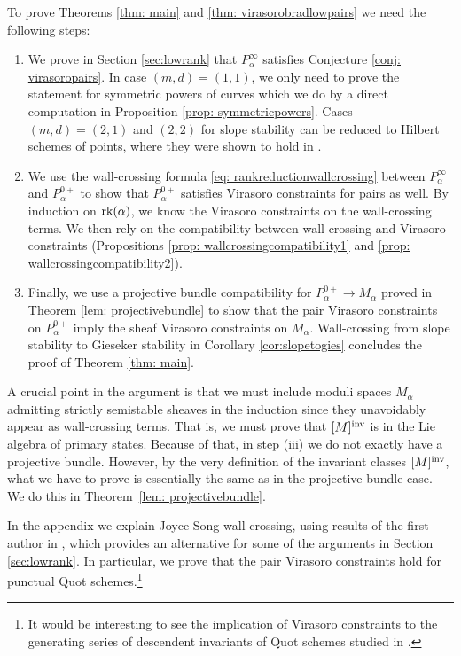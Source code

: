 \documentclass[a4paper, 12pt]{amsart}
\begin{document}
To prove Theorems \ref{thm: main} and \ref{thm: virasorobradlowpairs} we need the following steps:
\begin{enumerate}
\item[(i)] We prove in Section \ref{sec:lowrank} that $P^{\infty}_\alpha$ satisfies Conjecture \ref{conj: virasoropairs}. In case $(m,d)=(1,1)$, we only need to prove the statement for symmetric powers of curves which we do by a direct computation in Proposition \ref{prop: symmetricpowers}. Cases $(m,d)=(2,1)$ and $(2,2)$ for slope stability can be reduced to Hilbert schemes of points, where they were shown to hold in \cite{moop, moreira}.
\item[(ii)] We use the wall-crossing formula \eqref{eq: rankreductionwallcrossing} between $P^{\infty}_\alpha$ and $P^{0+}_\alpha$ to show that $P^{0+}_\alpha$ satisfies Virasoro constraints for pairs as well. By induction on $\mathrm{rk}(\alpha)$, we know the Virasoro constraints on the wall-crossing terms. We then rely on the compatibility between wall-crossing and Virasoro constraints (Propositions \ref{prop: wallcrossingcompatibility1} and \ref{prop: wallcrossingcompatibility2}).
\item[(iii)]  Finally, we use a projective bundle compatibility for  $P^{0+}_\alpha\to M_\alpha$ proved in Theorem \ref{lem: projectivebundle} to show that the pair Virasoro constraints on $P^{0+}_\alpha$ imply the sheaf Virasoro constraints on $M_\alpha$.  Wall-crossing from slope stability to Gieseker stability in Corollary \ref{cor:slopetogies} concludes the proof of Theorem \ref{thm: main}.
\end{enumerate}
A crucial point in the argument is that we must include moduli spaces $M_\alpha$ admitting strictly semistable sheaves in the induction since they unavoidably appear as wall-crossing terms. That is, we must prove that $[M]^{\mathrm{inv}}$ is in the Lie algebra of primary states. Because of that, in step (iii) we do not exactly have a projective bundle. However, by the very definition of the invariant classes $[M]^{\mathrm{inv}}$, what we have to prove is essentially the same as in the projective bundle case. We do this in Theorem~\ref{lem: projectivebundle}.

In the appendix we explain Joyce-Song wall-crossing, using results of the first author in \cite{Bo21.5}, which provides an alternative for some of the arguments in Section \ref{sec:lowrank}. In particular, we prove that the pair Virasoro constraints hold for punctual Quot schemes.\footnote{It would be interesting to see the implication of Virasoro constraints to the generating series of descendent invariants of Quot schemes studied in \cite{JOP}.}
\end{document}
